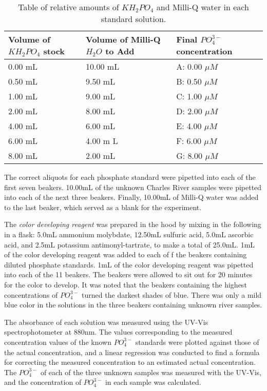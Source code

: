 \begin{table}[ht]
\begin{center}
    \begin{tabular}{ | p{3cm} | p{3cm} | p{3cm} |}
    \hline
    Volume of $KH_2PO_4$ stock  & Volume of Milli-Q $H_2O$ to Add  & Final $PO_4^{3-}$ concentration \\ \hline
    0.00 mL & 10.00 mL & A: 0.00 $\mu M$ \\ \hline
    0.50 mL & 9.50 mL & B: 0.50 $\mu M$ \\ \hline
    1.00 mL & 9.00 mL & C: 1.00 $\mu M$ \\ \hline
    2.00 mL & 8.00 mL & D: 2.00 $\mu M$ \\ \hline
    4.00 mL & 6.00 mL & E: 4.00 $\mu M$ \\ \hline
    6.00 mL & 4.00 m	L & F: 6.00 $\mu M$ \\ \hline
    8.00 mL & 2.00 mL & G: 8.00 $\mu M$ \\ \hline
    \end{tabular}
    \caption{Table of relative amounts of $KH_2PO_4$ and Milli-Q water in each standard solution.}
    \label{table:stds}
\end{center}
\end{table}

The correct aliquots for each phosphate standard were pipetted into each of the first seven beakers. 10.00mL of the unknown Charles River samples were pipetted into each of the next three beakers. Finally, 10.00mL of Milli-Q water was added to the last beaker, which served as a blank for the experiment. 

The \emph{color developing reagent} was prepared in the hood by mixing in the following in a flask:  5.0mL ammonium molybdate, 12.50mL sulfuric acid, 5.0mL ascorbic acid, and 2.5mL potassium antimonyl-tartrate, to make a total of 25.0mL. 1mL of the color developing reagent was added to each of f the beakers containing diluted phosphate standards. 1mL of the color developing reagent was pipetted into each of the 11 beakers. The beakers were allowed to sit out for 20 minutes for the color to develop. It was noted that the beakers containing the highest concentrations of $PO_4^{3-}$ turned the darkest shades of blue. There was only a mild blue color in the solutions in the three beakers containing unknown river samples. 

The absorbance of each solution was measured using the UV-Vis spectrophotometer at 880nm. The values corresponding to the measured concentration values of the known $PO_4^{3-}$ standards were plotted against those of the actual concentration, and a linear regression was conducted to find a formula for correcting the measured concentration to an estimated actual concentration. The $PO_4^{3-}$  of each of the three unknown samples was measured with the UV-Vis, and the concentration of $PO_4^{3-}$ in each sample was calculated.


